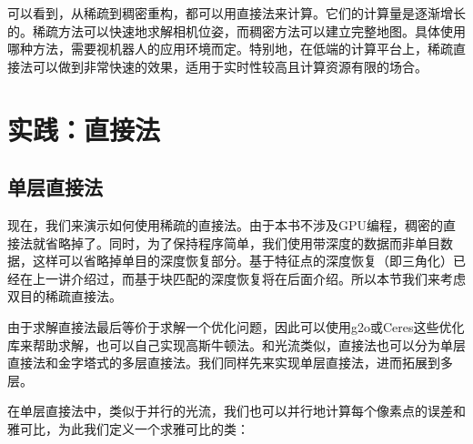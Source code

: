 可以看到，从稀疏到稠密重构，都可以用直接法来计算。它们的计算量是逐渐增长的。稀疏方法可以快速地求解相机位姿，而稠密方法可以建立完整地图。具体使用哪种方法，需要视机器人的应用环境而定。特别地，在低端的计算平台上，稀疏直接法可以做到非常快速的效果，适用于实时性较高且计算资源有限的场合\textsuperscript{\cite{Engel2016}}。

\section{实践：直接法}
\subsection{单层直接法}
现在，我们来演示如何使用稀疏的直接法。由于本书不涉及GPU编程，稠密的直接法就省略掉了。同时，为了保持程序简单，我们使用带深度的数据而非单目数据，这样可以省略掉单目的深度恢复部分。基于特征点的深度恢复（即三角化）已经在上一讲介绍过，而基于块匹配的深度恢复将在后面介绍。所以本节我们来考虑双目的稀疏直接法。

由于求解直接法最后等价于求解一个优化问题，因此可以使用g2o或Ceres这些优化库来帮助求解，也可以自己实现高斯牛顿法。和光流类似，直接法也可以分为单层直接法和金字塔式的多层直接法。我们同样先来实现单层直接法，进而拓展到多层。

在单层直接法中，类似于并行的光流，我们也可以并行地计算每个像素点的误差和雅可比，为此我们定义一个求雅可比的类：

